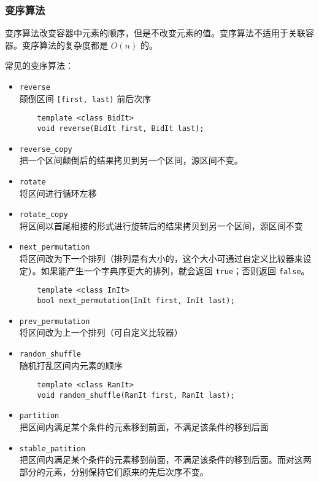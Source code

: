 \documentclass[UTF8]{ctexart}
\begin{document}
\subsubsection{变序算法}
变序算法改变容器中元素的顺序，但是不改变元素的值。变序算法不适用于关联容器。变序算法的复杂度都是 $O(n)$ 的。

常见的变序算法：
\begin{itemize}
    \item \texttt{reverse} \\
    颠倒区间 \texttt{[first, last)} 前后次序
    \begin{verbatim}
    template <class BidIt>
    void reverse(BidIt first, BidIt last);
    \end{verbatim}
    \item \texttt{reverse\_copy} \\
    把一个区间颠倒后的结果拷贝到另一个区间，源区间不变。
    \item \texttt{rotate} \\
    将区间进行循环左移
    \item \texttt{rotate\_copy} \\
    将区间以首尾相接的形式进行旋转后的结果拷贝到另一个区间，源区间不变
    \item \texttt{next\_permutation} \\
    将区间改为下一个排列（排列是有大小的，这个大小可通过自定义比较器来设定）。如果能产生一个字典序更大的排列，就会返回
    \texttt{true}；否则返回 \texttt{false}。
    \begin{verbatim}
    template <class InIt>
    bool next_permutation(InIt first, InIt last);
    \end{verbatim}
    \item \texttt{prev\_permutation} \\
    将区间改为上一个排列（可自定义比较器）
    \item \texttt{random\_shuffle} \\
    随机打乱区间内元素的顺序
    \begin{verbatim}
    template <class RanIt>
    void random_shuffle(RanIt first, RanIt last);
    \end{verbatim}
    \item \texttt{partition} \\
    把区间内满足某个条件的元素移到前面，不满足该条件的移到后面
    \item \texttt{stable\_patition} \\
    把区间内满足某个条件的元素移到前面，不满足该条件的移到后面。而对这两部分的元素，分别保持它们原来的先后次序不变。
\end{itemize}
\end{document}
